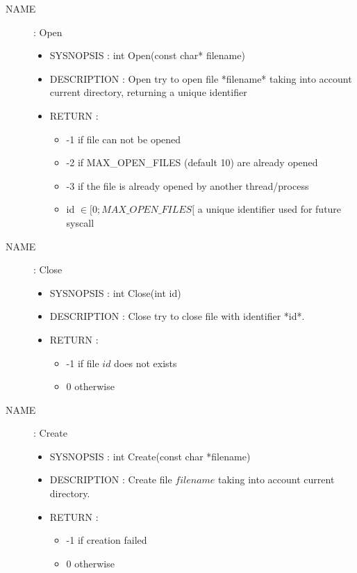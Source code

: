 \documentclass[a4paper,10pt]{article}
\begin{document}
\begin{description}
    \item [NAME] : Open
        \begin{itemize}
            \item SYSNOPSIS : int Open(const char* filename)
            \item DESCRIPTION :
                Open try to open file *filename* taking into account current directory,
                returning a unique identifier
            \item RETURN :
                \begin{itemize}
                    \item -1 if file can not be opened
                    \item -2 if MAX\_OPEN\_FILES (default 10) are already opened
                    \item -3 if the file is already opened by another thread/process
                    \item id $\in [0; MAX\_OPEN\_FILES[$ a unique identifier used for future syscall
                \end{itemize}
        \end{itemize}

    \item [NAME] : Close
        \begin{itemize}
            \item SYSNOPSIS : int Close(int id)
            \item DESCRIPTION :
                Close try to close file with identifier *id*.
            \item RETURN :
                \begin{itemize}
                    \item -1 if file $id$ does not exists
                    \item 0 otherwise
                \end{itemize}
        \end{itemize}

    \item [NAME] : Create
        \begin{itemize}
            \item SYSNOPSIS : int Create(const char *filename)
            \item DESCRIPTION :
                Create file $filename$ taking into account current directory.
            \item RETURN :
                \begin{itemize}
                    \item -1 if creation failed
                    \item 0 otherwise
                \end{itemize}
        \end{itemize}


\end{description}
\end{document}
